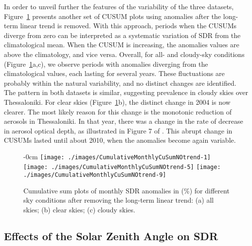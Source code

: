 \documentclass[applsci,article,submit,moreauthors,pdftex]{Definitions/mdpi}
\begin{document}
In order to unveil further the features of the variability of the three
datasets, Figure~\ref{fig:cusumnotrendmonthly} presents another set of
CUSUM plots using anomalies after the long-term linear trend is removed.
With this approach, periods when the CUSUMs diverge from zero can be
interpreted as a systematic variation of SDR from the climatological
mean. When the CUSUM is increasing, the anomalies values are above the
climatology, and vice versa. Overall, for all- and cloudy-sky conditions
(Figure~\ref{fig:cusumnotrendmonthly}a,c), we observe periods with
anomalies diverging from the climatological values, each lasting for
several years. These fluctuations are probably within the natural
variability, and no distinct changes are identified. The pattern in both
datasets is similar, suggesting prevalence in cloudy skies over
Thessaloniki. For clear skies (Figure~\ref{fig:cusumnotrendmonthly}b),
the distinct change in 2004 is now clearer. The most likely reason for
this change is the monotonic reduction of aerosols in Thessaloniki. In
that year, there was a change in the rate of decrease in aerosol optical
depth, as illustrated in Figure 7 of \citet{Siomos2020}. This abrupt
change in CUSUMs lasted until about 2010, when the anomalies become
again variable.

\begin{figure}[h!]
    \begin{adjustwidth}{-\extralength}{0cm}
        {\centering 
                {\texttt{[image: ./images/CumulativeMonthlyCuSumNOtrend-1]} }\hfill
                {\texttt{[image: ./images/CumulativeMonthlyCuSumNOtrend-5]} }\hfill
                {\texttt{[image: ./images/CumulativeMonthlyCuSumNOtrend-9]} }
        }
    \end{adjustwidth}
    \caption{Cumulative sum plots of monthly SDR anomalies in (\%) for different sky conditions after removing the long-term linear trend: (a) all skies; (b) clear skies; (c) cloudy skies.}\label{fig:cusumnotrendmonthly}
\end{figure}

\hypertarget{effects-of-the-solar-zenith-angle-on-sdr}{%
\subsection{Effects of the Solar Zenith Angle on
SDR}\label{effects-of-the-solar-zenith-angle-on-sdr}}
\end{document}
